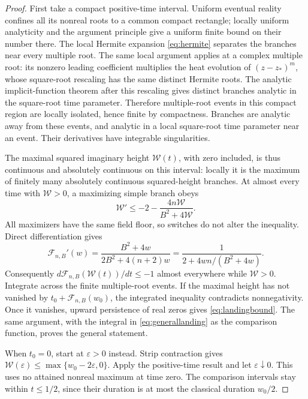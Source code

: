 \documentclass[11pt]{article}
\numberwithin{equation}{section}
\theoremstyle{definition}
\theoremstyle{remark}
\begin{document}
\begin{proof}
First take a compact positive-time interval. Uniform eventual reality
confines all its nonreal roots to a common compact rectangle; locally
uniform analyticity and the argument principle give a uniform finite
bound on their number there. The local Hermite expansion
\eqref{eq:hermite} separates the branches near every multiple root.
The same local argument applies at a complex multiple root: its
nonzero leading coefficient multiplies the heat evolution of
$(z-z_*)^m$, whose square-root rescaling has the same distinct Hermite
roots. The analytic implicit-function theorem after this rescaling
gives distinct branches analytic in the square-root time parameter.
Therefore multiple-root events in this compact region are locally
isolated, hence finite by compactness. Branches are analytic away
from these events, and analytic in a local square-root time parameter
near an event. Their derivatives have integrable singularities.

The maximal squared imaginary height $\mathcal W(t)$, with zero
included, is thus continuous and absolutely continuous on this
interval: locally it is the maximum of finitely many absolutely
continuous squared-height branches. At almost every time with
$\mathcal W>0$, a maximizing simple branch obeys
\[
 \mathcal W'\le-2-\frac{4n\mathcal W}{B^2+4\mathcal W}.
\]
All maximizers have the same field floor, so switches do not alter
the inequality. Direct differentiation gives
\begin{equation}\label{eq:landingderivative}
 \mathcal F_{n,B}'(w)
 =\frac{B^2+4w}{2B^2+4(n+2)w}
 =\frac1{2+4wn/(B^2+4w)}.
\end{equation}
Consequently $d\mathcal F_{n,B}(\mathcal W(t))/dt\le-1$ almost
everywhere while $\mathcal W>0$. Integrate across the finite
multiple-root events. If the maximal height has not vanished by
$t_0+\mathcal F_{n,B}(w_0)$, the integrated inequality contradicts
nonnegativity. Once it vanishes, upward persistence of real zeros
gives \eqref{eq:landingbound}. The same argument, with the integral
in \eqref{eq:generallanding} as the comparison function, proves the
general statement.

When $t_0=0$, start at $\varepsilon>0$ instead.
Strip contraction gives
$\mathcal W(\varepsilon)\le\max\{w_0-2\varepsilon,0\}$.
Apply the positive-time result and let $\varepsilon\downarrow0$.
This uses no attained nonreal maximum at time zero. The comparison
intervals stay within $t\le1/2$, since their duration is at most
the classical duration $w_0/2$.
\end{proof}
\end{document}
